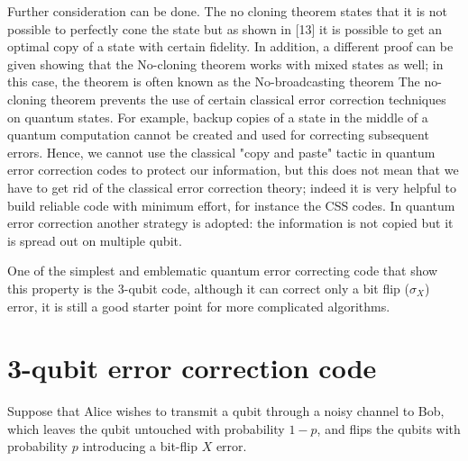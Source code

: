 Further consideration can be done. The no cloning theorem states that it is not possible to perfectly cone the state but as shown in [13] it is possible to get an optimal copy of a state with certain fidelity. In addition, a different proof can be given showing that the No-cloning theorem works with mixed states as well; in this case, the theorem is often known as the No-broadcasting theorem
The no-cloning theorem prevents the use of certain classical error correction techniques on quantum states. For example, backup copies of a state in the middle of a quantum computation cannot be created and used for correcting subsequent errors.
Hence, we cannot use the classical "copy and paste" tactic in quantum error correction codes to protect our information, but this does not mean that we have to get rid of the classical error correction theory; indeed it is very helpful to build reliable code with minimum effort, for instance the CSS codes.
In quantum error correction another strategy is adopted: the information is not copied but it is spread out on multiple qubit. 


One of the simplest and emblematic quantum error correcting code that show this property is the 3-qubit code, although it can correct only a bit flip ($\sigma_X$) error, it is still a good starter point for more complicated algorithms.

\section{3-qubit error correction code}

Suppose that Alice wishes to transmit a qubit through a noisy channel to Bob, which leaves the qubit untouched with probability $1-p$, and flips the qubits with probability $p$ introducing a bit-flip $X$ error.

